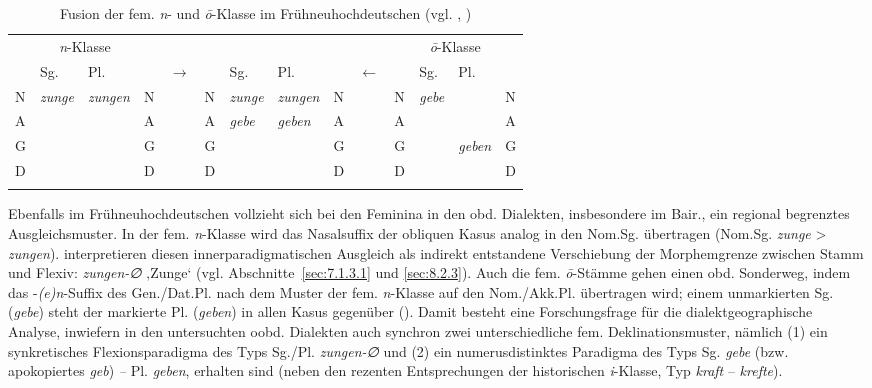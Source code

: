 \begin{table}
\small
\begin{tabular}{llll @{\,}c@{\,} llll @{\,}c@{\,} ll|ll}
\lsptoprule
 & \multicolumn{2}{c}{\textit{n}-Klasse} &  &  &  &  &  &  &  & & \multicolumn{2}{c}{\textit{ō}-Klasse} & \\
\cmidrule(lr){2-3}\cmidrule(lr){12-13}
 & {Sg.} & {Pl.} &  & ${\rightarrow}$ &  & Sg. & {Pl.} &  & ${\leftarrow}$ &  & \multicolumn{1}{l}{Sg.} & {Pl.} & \\
\midrule
N & \multicolumn{1}{l|}{\textit{zunge}} & \textit{zungen} & N &  & N & \textit{zunge} & \textit{zungen} & N &  & N & \textit{gebe} &  & N\\ \cline{2-2}
A &  &  & A &  & A & \textit{gebe} & \textit{geben} & A &  & A &  &  & A\\ \cline{13-13}
G &  &  & G &  & G &  &  & G &  & G &  & \textit{geben} & G\\
D &  &  & D &  & D &  &  & D &  & D &  &  & D\\
\lspbottomrule
\end{tabular}
\caption{Fusion der fem. \textit{n}{}- und \textit{ō}{}-Klasse im Frühneuhochdeutschen (vgl. \citealt[303]{Nübling2008}, \citealt[78]{KleinEtAl2018})}
\label{tab:10}
\end{table}

Ebenfalls im Frühneuhochdeutschen vollzieht sich bei den Feminina in den obd. Dialekten, insbesondere im Bair., ein regional begrenztes Ausgleichsmuster. In der fem. \textit{n}{}-Klasse wird das Nasalsuffix der obliquen Kasus analog in den Nom.Sg. übertragen (Nom.Sg. \textit{zunge} > \textit{zungen}). \citet[83]{KleinEtAl2018} interpretieren diesen innerparadigmatischen Ausgleich als indirekt entstandene Verschiebung der Morphemgrenze zwischen Stamm und Flexiv: \textit{zungen-∅} ‚Zunge‘ (vgl. Abschnitte~\ref{sec:7.1.3.1} und \ref{sec:8.2.3}). Auch die fem. \textit{ō}{}-Stämme gehen einen obd. Sonderweg, indem das -\textit{(e)n}{}-Suffix des Gen./Dat.Pl. nach dem Muster der fem. \textit{n}{}-Klasse auf den Nom./Akk.Pl. übertragen wird; einem unmarkierten Sg. (\textit{gebe}) steht der markierte Pl. (\textit{geben}) in allen Kasus gegenüber (\citealt[83]{KleinEtAl2018}). Damit besteht eine Forschungsfrage für die dialektgeographische Analyse, inwiefern in den untersuchten oobd. Dialekten auch synchron zwei unterschiedliche fem. Deklinationsmuster, nämlich (1) ein synkretisches Flexionsparadigma des Typs Sg./Pl. \textit{zungen-∅} und (2) ein numerusdistinktes Paradigma des Typs Sg. \textit{gebe} (bzw. apokopiertes \textit{geb}) \textit{--} Pl. \textit{geben}, erhalten sind (neben den rezenten Entsprechungen der historischen \textit{i}{}-Klasse, Typ \textit{kraft} -- \textit{krefte}).

